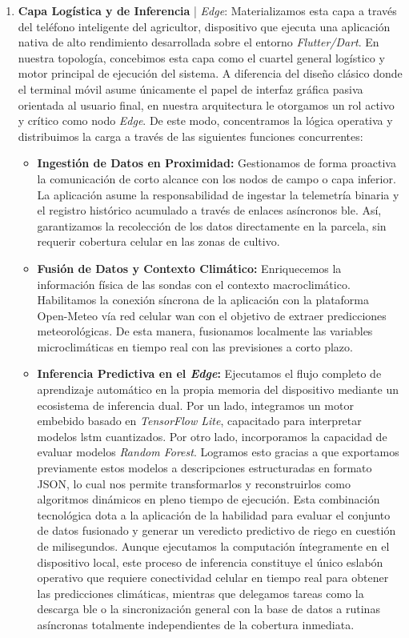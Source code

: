\begin{enumerate}
    \item \textbf{Capa Logística y de Inferencia} | \textit{Edge}: Materializamos esta capa a través del teléfono inteligente del agricultor, dispositivo que ejecuta una aplicación nativa de alto rendimiento desarrollada sobre el entorno \textit{Flutter/Dart}. En nuestra topología, concebimos esta capa como el cuartel general logístico y motor principal de ejecución del sistema. A diferencia del diseño clásico donde el terminal móvil asume únicamente el papel de interfaz gráfica pasiva orientada al usuario final, en nuestra arquitectura le otorgamos un rol activo y crítico como nodo \textit{Edge}. De este modo, concentramos la lógica operativa y distribuimos la carga a través de las siguientes funciones concurrentes:
    \begin{itemize}
        \item \textbf{Ingestión de Datos en Proximidad:} Gestionamos de forma proactiva la comunicación de corto alcance con los nodos de campo o capa inferior. La aplicación asume la responsabilidad de ingestar la telemetría binaria y el registro histórico acumulado a través de enlaces asíncronos \gls{ble}. Así, garantizamos la recolección de los datos directamente en la parcela, sin requerir cobertura celular en las zonas de cultivo.
        \item \textbf{Fusión de Datos y Contexto Climático:} Enriquecemos la información física de las sondas con el contexto macroclimático. Habilitamos la conexión síncrona de la aplicación con la plataforma Open-Meteo vía red celular \gls{wan} con el objetivo de extraer predicciones meteorológicas. De esta manera, fusionamos localmente las variables microclimáticas en tiempo real con las previsiones a corto plazo.
        \item \textbf{Inferencia Predictiva en el \textit{Edge}:} Ejecutamos el flujo completo de aprendizaje automático en la propia memoria del dispositivo mediante un ecosistema de inferencia dual. Por un lado, integramos un motor embebido basado en \textit{TensorFlow Lite}, capacitado para interpretar modelos \gls{lstm} cuantizados. Por otro lado, incorporamos la capacidad de evaluar modelos \textit{Random Forest}. Logramos esto gracias a que exportamos previamente estos modelos a descripciones estructuradas en formato JSON, lo cual nos permite transformarlos y reconstruirlos como algoritmos dinámicos en pleno tiempo de ejecución. Esta combinación tecnológica dota a la aplicación de la habilidad para evaluar el conjunto de datos fusionado y generar un veredicto predictivo de riego en cuestión de milisegundos. Aunque ejecutamos la computación íntegramente en el dispositivo local, este proceso de inferencia constituye el único eslabón operativo que requiere conectividad celular en tiempo real para obtener las predicciones climáticas, mientras que delegamos tareas como la descarga \gls{ble} o la sincronización general con la base de datos a rutinas asíncronas totalmente independientes de la cobertura inmediata.

\end{itemize}
\end{enumerate}
